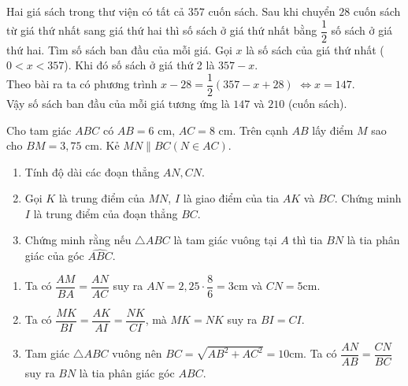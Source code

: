 \begin{ex}%
Hai giá sách trong thư viện có tất cả $357$ cuốn sách. Sau khi chuyển $28$ cuốn sách từ giá thứ nhất sang giá thứ hai thì số sách ở giá thứ nhất bằng $\dfrac{1}{2}$ số sách ở giá thứ hai. Tìm số sách ban đầu của mỗi giá.
\loigiai
    {
Gọi $x$ là số sách của giá thứ nhất ($0<x<357$). Khi đó số sách ở giá thứ 2 là $357-x$.\\
Theo bài ra ta có phương trình $x-28=\dfrac{1}{2}(357-x+28)$ $\Leftrightarrow x=147$.\\
Vậy số sách ban đầu của mỗi giá tương ứng là $147$ và $210$ (cuốn sách).  
    }
\end{ex}

\begin{ex}%
  Cho tam giác $ABC$ có $AB=6$ cm, $ AC=8$ cm. Trên cạnh $AB$ lấy điểm $M$ sao cho $BM=3,75$ cm. Kẻ $MN \parallel BC (N \in AC)$.
   \begin{enumerate}
        \item  Tính độ dài các đoạn thẳng $AN,CN$.
        \item Gọi $K$ là trung điểm của $MN$, $I$ là giao điểm của tia $AK$ và $BC$. Chứng minh $I$ là trung điểm của đoạn thẳng $BC$.
        \item Chứng minh rằng nếu $\triangle ABC$ là tam giác vuông tại $A$ thì tia $BN$ là tia phân giác của góc $\widehat{ABC}$.
    \end{enumerate}
\loigiai
    {
    \begin{center}
\end{center}

 \begin{enumerate}
        \item  Ta có $\dfrac{AM}{BA}=\dfrac{AN}{AC}$ suy ra $AN=2,25\cdot \dfrac{8}{6}=3$cm và $CN=5$cm.
        \item  Ta có $\dfrac{MK}{BI}=\dfrac{AK}{AI}=\dfrac{NK}{CI}$, mà $MK=NK$ suy ra $BI=CI$.
        \item  Tam giác $\triangle ABC$ vuông nên $BC=\sqrt{AB^2+AC^2}=10$cm. Ta có $\dfrac{AN}{AB}=\dfrac{CN}{BC}$ suy ra $BN$ là tia phân giác góc $ABC$.
    \end{enumerate}
    }
\end{ex}

